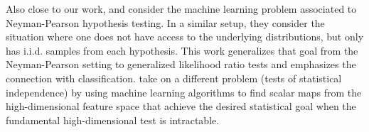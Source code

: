 \documentclass[12pt]{article}
\numberwithin{equation}{section}
\theoremstyle{plain}
\begin{document}
Also close to our work, \cite{ClaytonScott} and \cite{JMLR:v14:tong13a} consider
the machine learning problem associated to Neyman-Pearson hypothesis testing. In
a similar setup, they consider the situation where one does not have access to
the underlying distributions, but only has i.i.d. samples from each hypothesis.
This work generalizes that goal from the Neyman-Pearson setting to generalized
likelihood ratio tests and emphasizes the connection with classification.
\cite{Ihler2004} take on a different problem
(tests of statistical independence) by using machine learning algorithms to find
scalar maps from the high-dimensional feature space that achieve the desired
statistical goal when the fundamental high-dimensional test is intractable.

\end{document}
